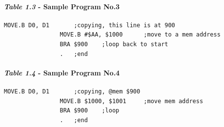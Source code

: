 \documentclass{article}
\begin{document}
			\paragraph{\textit{Table 1.3} - Sample Program No.3}
				\begin{verbatim}MOVE.B D0, D1		;copying, this line is at 900
				MOVE.B #$AA, $1000		;move to a mem address
				BRA $900	;loop back to start
				.	;end
				\end{verbatim}
			\paragraph{\textit{Table 1.4} - Sample Program No.4}
				\begin{verbatim}MOVE.B D0, D1		;copying, @mem $900
				MOVE.B $1000, $1001		;move mem address
				BRA $900	;loop
				.	;end
				\end{verbatim}
\end{document}
